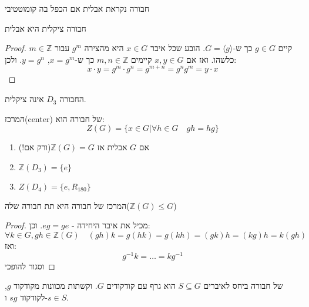 \documentclass{tstextbook}
\begin{document}
\begin{definition}
חבורה נקראת אבלית אם הכפל בה קומוטטיבי

\end{definition}
\begin{proposition}
חבורה ציקלית היא אבלית

\end{proposition}
\begin{proof}
קיים \(g\in G\) כך ש-\(G=\langle g\rangle\). הובע שכל איבר \(x \in G\) היא מהצירה \(g^m\) עבור \(m\in \mathbb{Z}\) כלשהו. ואז אם \(x,y \in G\) קיימים \(m,n \in \mathbb{Z}\) כך ש-\(x=g^m\), \(y=g^n\). ולכן:
$$x\cdot y=g^m \cdot g^n=g^{m+n}=g^n g^m=y\cdot x$$

\end{proof}
\begin{corollary}
החבורה \(D_{3}\) אינה ציקלית. 

\end{corollary}
\begin{definition}
המרכז(center) של חבורה הוא:
$$Z(G) =\{ x \in G \big| \forall h\in G\quad gh=hg \}$$

\end{definition}
\begin{example}
  \begin{enumerate}
    \item אם \(G\) אבלית אז \(\mathbb{Z}(G)=G\)(ורק אם!) 


    \item \(\mathbb{Z}(D_{3})=\{ e \}\)


    \item \(Z(D_{4})=\{ e, R_{180} \}\)


  \end{enumerate}
\end{example}
\begin{proposition}
המרכז של חבורה היא תת חבורה שלה(\(\mathbb{Z}(G)\leq G\))

\end{proposition}
\begin{proof}
מכיל את איבר היחידה - \(eg=ge\). וכן:
$$\forall k \in G, gh \in \mathbb{Z}(G) \quad (gh)k=g(hk)=g(kh)=(gk)h=(kg)h=k(gh)$$
ואז:
$$g^{-1}k=\dots=kg^{-1}$$
וסגור להופכי

\end{proof}
\begin{definition}
של חבורה ביחס לאיברים \(S\subseteq G\) הוא גרף עם קודקודים \(G\). וקשתות מכוונות מקודקוד \(g\), לקודקוד \(sg\) ו-\(s \in S\).

\end{definition}
\end{document}

